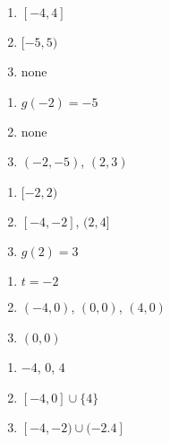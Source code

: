 \begin{multicols}{3}
\begin{enumerate}
\setcounter{enumi}{\value{HW}}

\item  $[-4,4]$ 
\item  $[-5,5)$
\item  none

\setcounter{HW}{\value{enumi}}
\end{enumerate}
\end{multicols}

\begin{multicols}{3}
\begin{enumerate}
\setcounter{enumi}{\value{HW}}

\item  $g(-2) = -5$
\item  none
\item  $(-2,-5)$, $(2,3)$

\setcounter{HW}{\value{enumi}}
\end{enumerate}
\end{multicols}

\begin{multicols}{3}
\begin{enumerate}
\setcounter{enumi}{\value{HW}}

\item  $[-2,2)$
\item  $[-4, -2]$, $(2,4]$
\item  $g(2) = 3$

\setcounter{HW}{\value{enumi}}
\end{enumerate}
\end{multicols}


\begin{multicols}{3}
\begin{enumerate}
\setcounter{enumi}{\value{HW}}

\item  $t=-2$
\item $(-4,0)$, $(0,0)$, $(4,0)$
\item  $(0,0)$

\setcounter{HW}{\value{enumi}}
\end{enumerate}
\end{multicols}

\begin{multicols}{3}
\begin{enumerate}
\setcounter{enumi}{\value{HW}}

\item  $-4$, $0$, $4$
\item  $[-4,0] \cup \{4\}$
\item $[-4,-2) \cup (-2.4]$

\setcounter{HW}{\value{enumi}}
\end{enumerate}
\end{multicols}

